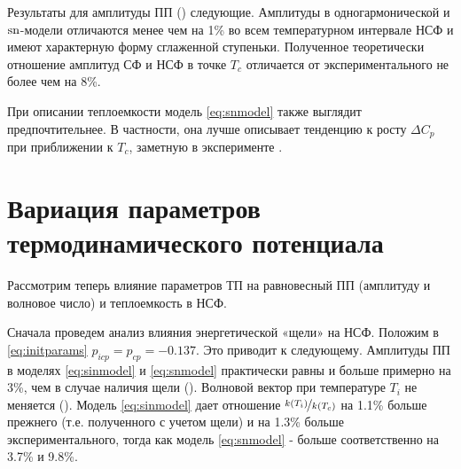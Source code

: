 Результаты для амплитуды ПП () следующие. Амплитуды в одногармонической и $\operatorname{sn}$-модели отличаются менее чем на 1\% во всем температурном интервале НСФ и имеют характерную форму сглаженной ступеньки. 
Полученное теоретически отношение амплитуд СФ и НСФ в точке $T_c$ отличается от экспериментального \cite{Vysochanskii1994} не более чем на 8\%.

При описании теплоемкости  модель \eqref{eq:snmodel} также выглядит предпочтительнее. 
В частности, она лучше описывает тенденцию к росту $\Delta C_p$ при приближении к $T_c$, заметную в эксперименте .


\section{Вариация параметров термодинамического потенциала}\label{sec:variate}

Рассмотрим теперь влияние параметров ТП на равновесный ПП (амплитуду и волновое число) и теплоемкость в НСФ.

Сначала проведем анализ влияния энергетической «щели» на НСФ. Положим в \eqref{eq:initparams} $p_{icp} = p_{cp} = -0.137$. Это приводит к следующему. Амплитуды ПП в моделях \eqref{eq:sinmodel} и \eqref{eq:snmodel} практически равны и больше примерно на 3\%, чем в случае наличия щели (). Волновой вектор при температуре $T_i$ не меняется (). Модель \eqref{eq:sinmodel} дает отношение $\nicefrac{k(T_i)}{k(T_c)}$ на 1.1\% больше прежнего (т.е. полученного с учетом щели) и на 1.3\% больше экспериментального, тогда как модель \eqref{eq:snmodel} - больше соответственно на 3.7\% и 9.8\%.

